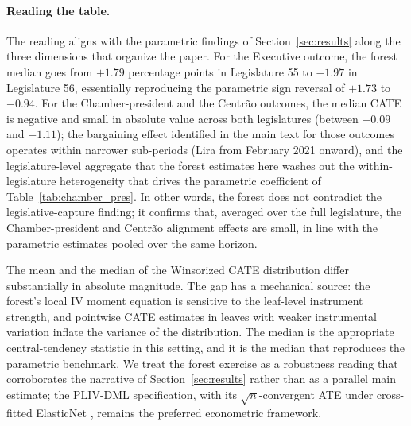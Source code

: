 \documentclass[pdflatex,sn-basic]{sn-jnl}
\begin{document}
\paragraph{Reading the table.} The reading aligns with the parametric findings of Section~\ref{sec:results} along the three dimensions that organize the paper. For the Executive outcome, the forest median goes from $+1.79$ percentage points in Legislature 55 to $-1.97$ in Legislature 56, essentially reproducing the parametric sign reversal of $+1.73$ to $-0.94$. For the Chamber-president and the Centr\~ao outcomes, the median CATE is negative and small in absolute value across both legislatures (between $-0.09$ and $-1.11$); the bargaining effect identified in the main text for those outcomes operates within narrower sub-periods (Lira from February 2021 onward), and the legislature-level aggregate that the forest estimates here washes out the within-legislature heterogeneity that drives the parametric coefficient of Table~\ref{tab:chamber_pres}. In other words, the forest does not contradict the legislative-capture finding; it confirms that, averaged over the full legislature, the Chamber-president and Centr\~ao alignment effects are small, in line with the parametric estimates pooled over the same horizon.

The mean and the median of the Winsorized CATE distribution differ substantially in absolute magnitude. The gap has a mechanical source: the forest's local IV moment equation is sensitive to the leaf-level instrument strength, and pointwise CATE estimates in leaves with weaker instrumental variation inflate the variance of the distribution. The median is the appropriate central-tendency statistic in this setting, and it is the median that reproduces the parametric benchmark. We treat the forest exercise as a robustness reading that corroborates the narrative of Section~\ref{sec:results} rather than as a parallel main estimate; the PLIV-DML specification, with its $\sqrt{n}$-convergent ATE under cross-fitted ElasticNet \citep{Chernozhukov2018}, remains the preferred econometric framework.
\end{document}
